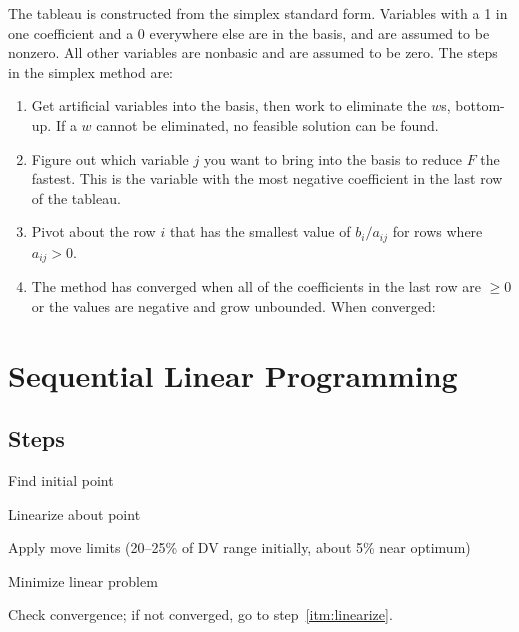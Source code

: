 \documentclass{article}
\begin{document}
The tableau is constructed from the simplex standard form. Variables with a 1 in
one coefficient and a 0 everywhere else are in the basis, and are assumed to be
nonzero. All other variables are nonbasic and are assumed to be zero. The steps
in the simplex method are:
\begin{enumerate}
\item Get artificial variables into the basis, then work to eliminate the \(w\)s, bottom-up. If a \(w\) cannot be eliminated, no feasible solution can be found.
\item Figure out which variable \(j\) you want to bring into the basis to reduce \(F\)
  the fastest. This is the variable with the most negative coefficient in the last row of the tableau.
\item Pivot about the row \(i\) that has the smallest value of \(b_i / a_{ij}\) for rows where \(a_{ij} > 0\).
\item The method has converged when all of the coefficients in the last row are
  \(\ge 0\) or the values are negative and grow unbounded. When converged:
\end{enumerate}

\section{Sequential Linear Programming}

\subsection*{Steps}

\begin{enumerate*}
\item Find initial point
\item \label{itm:linearize} Linearize about point
\item Apply move limits (20--25\% of DV range initially, about 5\% near optimum)
\item Minimize linear problem
\item Check convergence; if not converged, go to step~\ref{itm:linearize}.
\end{enumerate*}
\end{document}
